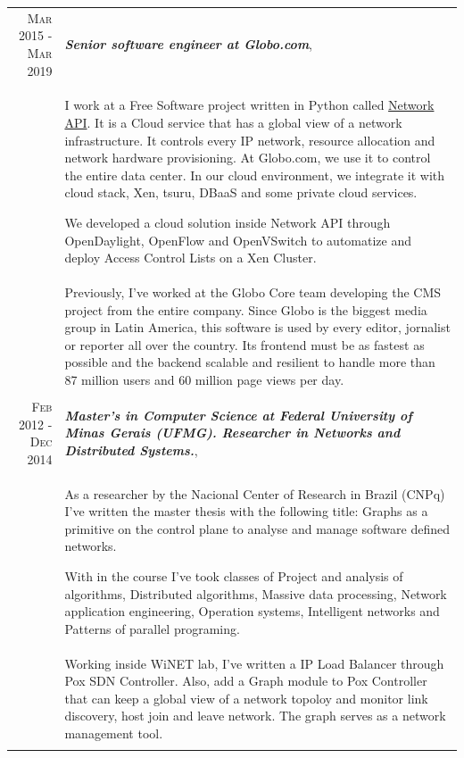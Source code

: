 \documentclass[a4paper,10pt]{article} %
\begin{document}
\begin{longtable}{r|p{11cm}}
\textsc{Mar 2015 - Mar 2019} & \emph{\bf Senior software engineer at Globo.com}, \\
& \footnotesize{I work at a Free Software project written in Python called
	\href{https://github.com/globocom/GloboNetworkAPI}{Network API}.
    It is a Cloud service that has a global view of a network infrastructure.
    It controls every IP network, resource allocation and network
    hardware provisioning. At Globo.com, we use it to control the entire
    data center. In our cloud environment, we integrate it with cloud stack,
    Xen, tsuru, DBaaS and some private cloud services.

    We developed a cloud solution inside Network API through OpenDaylight,
    OpenFlow and OpenVSwitch to automatize and deploy Access Control Lists on a
    Xen Cluster.} \\

& \footnotesize{
    Previously, I've worked at the Globo Core team developing the CMS project
    from the entire company. Since Globo is the biggest media group in Latin
    America, this software is used by every editor, jornalist or reporter all
    over the country. Its frontend must be as fastest as possible and the
    backend scalable and resilient to handle more than 87 million users and 60
    million page views per day.} \\
\multicolumn{2}{c}{} \\


\textsc{Feb 2012 - Dec 2014} & \emph{\bf Master's in Computer Science at
Federal University of Minas Gerais (UFMG). Researcher in
Networks and Distributed Systems.}, \\
& \footnotesize{As a researcher by the Nacional Center of Research in Brazil
    (CNPq) I've written the master thesis with the following title: Graphs as
    a primitive on the control plane to analyse and manage software defined
    networks.

    With in the course I've took classes of Project and analysis of algorithms,
    Distributed algorithms, Massive data processing, Network application
    engineering, Operation systems, Intelligent networks and Patterns of
    parallel programing.} \\

& \footnotesize{
    Working inside WiNET lab, I've written a IP Load Balancer through Pox SDN
    Controller. Also, add a Graph module to
    Pox Controller that can keep a global view of a network topoloy and monitor
    link discovery, host join and leave network. The graph serves as a network
    management tool.} \\
\multicolumn{2}{c}{} \\


\end{longtable}
\end{document}
